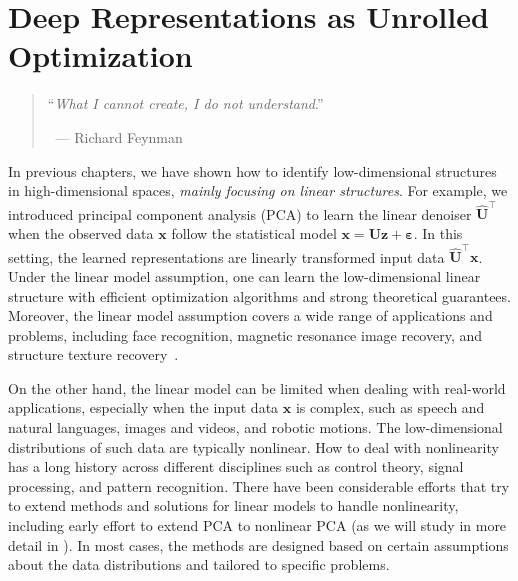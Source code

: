 \documentclass[../../book-main.tex]{subfiles}
\begin{document}
\chapter{Deep Representations as Unrolled Optimization}
\label{ch:representation}
\label{ch:unrolling}

\begin{quote}
\hfill    ``{\em What I cannot create, I do not understand}.''

$~$ \hfill --- Richard Feynman   
\end{quote}
\vspace{5mm}




In previous chapters, we have shown how to identify low-dimensional structures in high-dimensional spaces, \textit{mainly focusing on linear structures}. 
For example, we introduced principal component analysis (PCA) to learn the linear denoiser $\hat{\bm{U}}^{\top}$ when the observed data $\bm{x}$ follow the statistical model $\bm{x} = \bm{U}\bm{z} + \bm{\varepsilon}$. 
In this setting, the learned representations are linearly transformed input data $\hat{\bm{U}}^{\top}\bm{x}$.
Under the linear model assumption, one can learn the low-dimensional linear structure with efficient optimization algorithms and strong theoretical guarantees. 
Moreover, the linear model assumption covers a wide range of applications and problems, including face recognition, magnetic resonance image recovery, and structure texture recovery~\cite{Wright-Ma-2022}.

On the other hand, the linear model can be limited when dealing with real-world applications, especially when the input data $\bm{x}$ is complex, such as speech and natural languages, images and videos, and robotic motions. The low-dimensional distributions of such data are typically nonlinear. 
How to deal with nonlinearity has a long history across different disciplines such as control theory, signal processing, and pattern recognition.  There have been considerable efforts that try to extend methods and solutions for linear models to handle nonlinearity, including early effort to extend PCA to nonlinear PCA (as we will study in more detail in ).  In most cases, the methods are designed based on certain assumptions about the data distributions and tailored to specific problems. 
\end{document}
